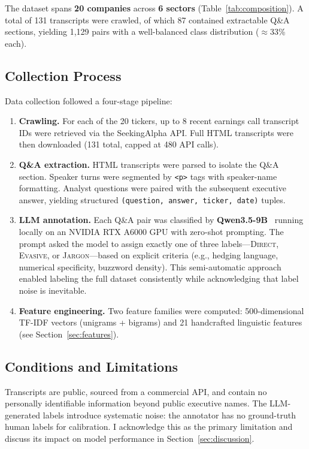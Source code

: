 \documentclass[12pt]{article}
\begin{document}
The dataset spans \textbf{20 companies} across \textbf{6 sectors}
(Table~\ref{tab:composition}). A total of 131 transcripts were crawled,
of which 87 contained extractable Q\&A sections, yielding 1{,}129 pairs
with a well-balanced class distribution ($\approx$33\% each).

\subsection{Collection Process}

Data collection followed a four-stage pipeline:
\begin{enumerate}[nosep]
    \item \textbf{Crawling.} For each of the 20 tickers, up to 8 recent
          earnings call transcript IDs were retrieved via the SeekingAlpha API.
          Full HTML transcripts were then downloaded (131 total, capped at
          480 API calls).
    \item \textbf{Q\&A extraction.} HTML transcripts were parsed to isolate
          the Q\&A section. Speaker turns were segmented by
          \texttt{<p>} tags with speaker-name formatting. Analyst questions
          were paired with the subsequent executive answer, yielding
          structured \texttt{(question, answer, ticker, date)} tuples.
    \item \textbf{LLM annotation.} Each Q\&A pair was classified by
          \textbf{Qwen3.5-9B}~\cite{qwen} running locally on an
          NVIDIA RTX A6000 GPU with zero-shot
          prompting. The prompt asked the model to assign exactly one of
          three labels---\textsc{Direct}, \textsc{Evasive}, or
          \textsc{Jargon}---based on explicit criteria (e.g., hedging
          language, numerical specificity, buzzword density). This
          semi-automatic approach enabled labeling the full dataset
          consistently while acknowledging that label noise is inevitable.
    \item \textbf{Feature engineering.} Two feature families were computed:
          500-dimensional TF-IDF vectors (unigrams + bigrams) and 21
          handcrafted linguistic features (see Section~\ref{sec:features}).
\end{enumerate}

\subsection{Conditions and Limitations}

Transcripts are public, sourced from a commercial API, and contain no
personally identifiable information beyond public executive names. The
LLM-generated labels introduce systematic noise: the annotator has no
ground-truth human labels for calibration. I acknowledge this as the
primary limitation and discuss its impact on model performance in
Section~\ref{sec:discussion}.
\end{document}
